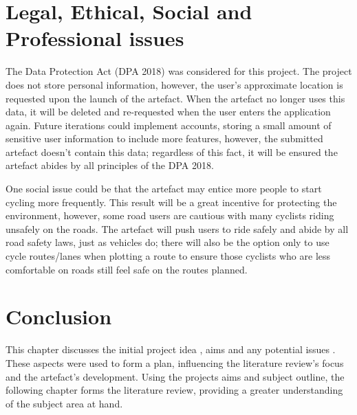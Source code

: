 \clearpage
\section{Legal, Ethical, Social and Professional issues}
\label{intro:legal...issues}

The Data Protection Act (DPA 2018) was considered for this project. The project does not store personal information, however, the user’s approximate location is requested upon the launch of the artefact. When the artefact no longer uses this data, it will be deleted and re-requested when the user enters the application again. Future iterations could implement accounts, storing a small amount of sensitive user information to include more features, however, the submitted artefact doesn't contain this data; regardless of this fact, it will be ensured the artefact abides by all principles of the DPA 2018.

One social issue could be that the artefact may entice more people to start cycling more frequently. This result will be a great incentive for protecting the environment, however, some road users are cautious with many cyclists riding unsafely on the roads. The artefact will push users to ride safely and abide by all road safety laws, just as vehicles do; there will also be the option only to use cycle routes/lanes when plotting a route to ensure those cyclists who are less comfortable on roads still feel safe on the routes planned.

\section{Conclusion}
\label{intro:conclusion}

This chapter discusses the initial project idea , aims  and any potential issues . These aspects were used to form a plan, influencing the literature review's focus and the artefact's development. Using the projects aims and subject outline, the following chapter forms the literature review, providing a greater understanding of the subject area at hand.